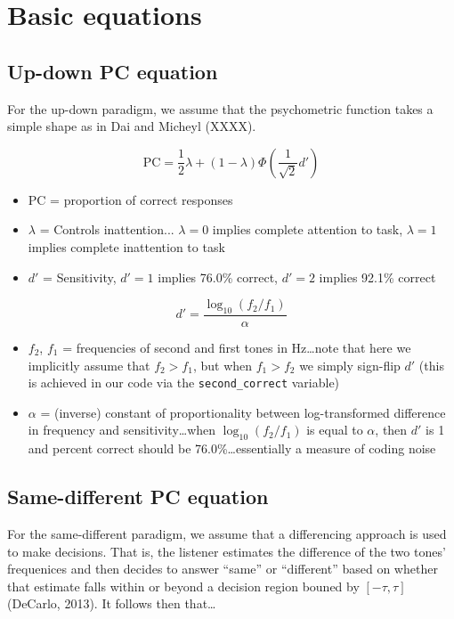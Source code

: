 \documentclass[11pt]{article}
\begin{document}
\section{Basic equations}

\subsection{Up-down PC equation}

For the up-down paradigm, we assume that the psychometric function takes a simple shape as in Dai and Micheyl (XXXX).

\begin{equation}
		\text{PC} = \frac{1}{2} \lambda + (1 - \lambda) \Phi \left(\frac{1}{\sqrt{2}} d' \right)
\end{equation}

\begin{itemize}
	\item PC = proportion of correct responses
	\item $\lambda$ = Controls inattention... $\lambda=0$ implies complete attention to task, $\lambda=1$ implies complete inattention to task
	\item $d'$ = Sensitivity, $d'=1$ implies 76.0\% correct, $d'=2$ implies 92.1\% correct
\end{itemize}

\begin{equation}
		d' = \frac{\log_{10}(f_2/f_1)}{\alpha}
\end{equation}

\begin{itemize}
	\item $f_2$, $f_1$ = frequencies of second and first tones in Hz\ldots note that here we implicitly assume that $f_2 > f_1$, but when $f_1 > f_2$ we simply sign-flip $d'$ (this is achieved in our code via the \texttt{second\_correct} variable)
	\item $\alpha$ = (inverse) constant of proportionality between log-transformed difference in frequency and sensitivity\ldots when $\log_{10}(f_2/f_1)$ is equal to $\alpha$, then $d'$ is 1 and percent correct should be 76.0\%\ldots essentially a measure of coding noise 
\end{itemize}

\subsection{Same-different PC equation}

For the same-different paradigm, we assume that a differencing approach is used to make decisions. That is, the listener estimates the difference of the two tones' frequenices and then decides to answer ``same'' or ``different'' based on whether that estimate falls within or beyond a decision region bouned by $[-\tau, \tau]$ (DeCarlo, 2013).
It follows then that\ldots 
\end{document}
